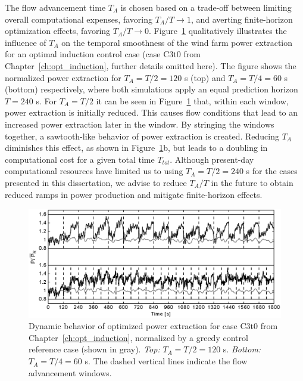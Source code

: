The flow advancement time $T_A$ is chosen based on a trade-off between limiting overall computational expenses, favoring $T_A/T \rightarrow 1$, and averting finite-horizon optimization effects, favoring $T_A/T \rightarrow 0$. Figure~\ref{fig:T_A} qualitatively illustrates the influence of $T_A$ on the temporal smoothness of the wind farm power extraction for an optimal induction control case (case C3t0 from Chapter~\ref{ch:opt_induction}, further details omitted here). The figure shows the normalized power extraction for $T_A = T/2 = 120$ s (top) and $T_A = T/4 = 60$ s (bottom) respectively, where both simulations apply an equal prediction horizon $T = 240$ s. For $T_A = T/2$ it can be seen in Figure~\ref{fig:T_A} that, within each window, power extraction is initially reduced. This causes flow conditions that lead to an increased power extraction later in the window. By stringing the windows together, a sawtooth-like behavior of power extraction is created. Reducing $T_A$ diminishes this effect, as shown in Figure~\ref{fig:T_A}b, but leads to a doubling in computational cost for a given total time $T_{tot}$. Although present-day computational resources have limited us to using $T_A = T/2 = 240$ s for the cases presented in this dissertation, we advise to reduce $T_A/T$ in the future to obtain reduced ramps in power production and mitigate finite-horizon effects.

\begin{figure}
	\centering
	\includegraphics[width=\linewidth]{chapters/optimal_control_problem/figure10.eps}
	\caption[Dynamic behavior of optimized power extraction for case C3t0 from Chapter~\ref{ch:opt_induction}, normalized by a greedy control reference case.]{Dynamic behavior of optimized power extraction for case C3t0 from Chapter~\ref{ch:opt_induction}, normalized by a greedy control reference case (shown in gray). \emph{Top: } $T_A = T/2 = 120$ s. \emph{Bottom: } $T_A = T/4 = 60$ s. The dashed vertical lines indicate the flow advancement windows.\label{fig:T_A}}
\end{figure}


